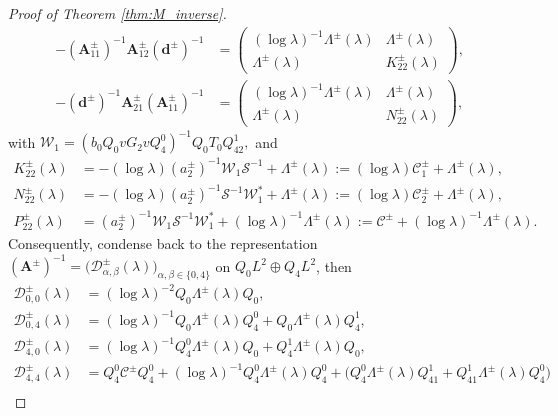 \documentclass[reqno]{amsart}
\numberwithin{equation}{section}
\begin{document}
\begin{proof}[Proof of Theorem \ref{thm:M_inverse}]
\[\begin{aligned}
			-(\mathbf{A}_{11}^{\pm})^{-1} \mathbf{A}_{12}^{\pm} (\boldsymbol{d}^\pm)^{-1}
			&= \begin{pmatrix}
				(\log \lambda)^{-1}\Lambda^\pm(\lambda) & \Lambda^\pm(\lambda) \\[4pt]
				\Lambda^\pm(\lambda) & K_{22}^\pm(\lambda)
			\end{pmatrix}, \\[8pt]
			-(\boldsymbol{d}^\pm)^{-1} \mathbf{A}_{21}^{\pm} (\mathbf{A}_{11}^{\pm})^{-1}
			&= \begin{pmatrix}
				(\log \lambda)^{-1}\Lambda^\pm(\lambda) & \Lambda^\pm(\lambda) \\[4pt]
				\Lambda^\pm(\lambda) & N_{22}^\pm(\lambda)
			\end{pmatrix},
		\end{aligned}
		\]
		with  $\mathcal{W}_1 = (b_0 Q_0 v G_2 v Q_4^0)^{-1} Q_0 T_0 Q_{42}^1,$ and
		\[
		\begin{aligned}
			K_{22}^\pm(\lambda) &= -(\log \lambda) (a_2^\pm)^{-1}\mathcal{W}_1 \mathcal{S}^{-1}+\Lambda^\pm(\lambda)
			:=(\log \lambda)\mathcal{C}_1^\pm+ \Lambda^\pm(\lambda), \\
			N_{22}^\pm(\lambda) &= -(\log \lambda) (a_2^\pm)^{-1}\mathcal{S}^{-1} \mathcal{W}_1^* +\Lambda^\pm(\lambda)
			:=(\log \lambda)\mathcal{C}_2^\pm+ \Lambda^\pm(\lambda), \\
			P_{22}^\pm(\lambda) & = (a_2^\pm)^{-1}\mathcal{W}_1 \mathcal{S}^{-1} \mathcal{W}_1^* +(\log \lambda)^{-1}\Lambda^\pm(\lambda)
			:=\mathcal{C}^\pm+(\log \lambda)^{-1}\Lambda^\pm(\lambda).
		\end{aligned}
		\]
	Consequently, condense back to the representation $(\mathbf{A}^\pm)^{-1} = \big( \mathcal{D}_{\alpha,\beta}^{\pm}(\lambda) \big)_{\alpha,\beta \in \{0,4\}}$ on \( Q_0 L^2 \oplus Q_4 L^2 \), then
	\begin{equation}\label{D40D04D44_2}
        \begin{split}
				\mathcal{D}_{0,0}^{\pm}(\lambda) &= (\log \lambda)^{-2} Q_0 \Lambda^\pm(\lambda) Q_0,   \\
				\mathcal{D}_{0,4}^{\pm}(\lambda) &= (\log \lambda)^{-1} Q_0 \Lambda^\pm(\lambda) Q_{4}^0+  Q_0 \Lambda^\pm(\lambda) Q_{4}^1,   \\
				\mathcal{D}_{4,0}^{\pm}(\lambda) &= (\log \lambda)^{-1} Q_{4}^0 \Lambda^\pm(\lambda) Q_0 +Q_{4}^1 \Lambda^\pm(\lambda) Q_0,  \\
				\mathcal{D}_{4,4}^{\pm}(\lambda)  &=Q_4^0\mathcal{C}^\pm Q_4^0+(\log \lambda)^{-1} Q_4^0\Lambda^\pm(\lambda) Q_4^0
				+\bigl(Q_4^0 \Lambda^\pm(\lambda) Q_{41}^1 + Q_{41}^1 \Lambda^\pm(\lambda) Q_4^0\bigr) \\

\end{split}
\end{equation}
\end{proof}
\end{document}
